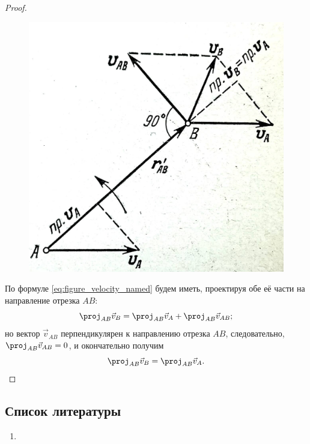 \begin{proof}
  \begin{figure}[H]
    \centering
    \resizebox{\linewidth}{!}
      {\includegraphics{src/mechanics/pictures/16_2.jpg}}

    \caption{}
    \label{fig:16_2}
  \end{figure}

  По формуле \ref{eq:figure_velocity_named} будем иметь, проектируя обе её части
  на направление отрезка $AB$:
  \begin{equation*}
    \proj_{AB} \vec{v}_B = \proj_{AB} \vec{v}_A + \proj_{AB} \vec{v}_{AB};
  \end{equation*}
  но вектор $\vec{v}_{AB}$ перпендикулярен к направлению отрезка $AB$,
  следовательно, $\proj_{AB} \vec{v}_{AB} = 0$, и окончательно получим
  \begin{equation*}
    \proj_{AB} \vec{v}_B = \proj_{AB} \vec{v}_A.
  \end{equation*}
\end{proof}

\subsection{Список литературы}
\begin{enumerate}
  \item \cite{lourie}
\end{enumerate}

